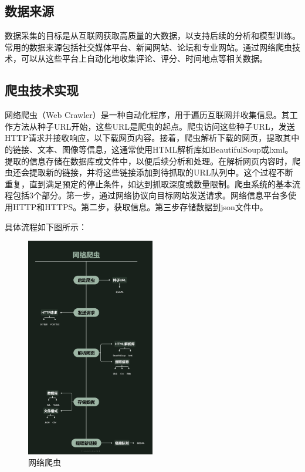 \documentclass[UTF8,a4paper,15pt,titlepage,oneside]{ctexbook}
\begin{document}
\subsection{数据来源}

数据采集的目标是从互联网获取高质量的大数据，以支持后续的分析和模型训练。常用的数据来源包括社交媒体平台、新闻网站、论坛和专业网站。通过网络爬虫技术，可以从这些平台上自动化地收集评论、评分、时间地点等相关数据。

\subsection{爬虫技术实现}

网络爬虫（Web Crawler）是一种自动化程序，用于遍历互联网并收集信息。其工作方法从种子URL开始，这些URL是爬虫的起点。爬虫访问这些种子URL，发送HTTP请求并接收响应，以下载网页内容。接着，爬虫解析下载的网页，提取其中的链接、文本、图像等信息，这通常使用HTML解析库如BeautifulSoup或lxml。提取的信息存储在数据库或文件中，以便后续分析和处理。在解析网页内容时，爬虫还会提取新的链接，并将这些链接添加到待抓取的URL队列中。这个过程不断重复，直到满足预定的停止条件，如达到抓取深度或数量限制。爬虫系统的基本流程包括3个部分。第一步，通过网络协议向目标网站发送请求。网络信息平台多使用HTTP和HTTPS。第二步，获取信息。第三步存储数据到json文件中。

具体流程如下图所示：


\begin{figure}[H]
  \centering
  \includegraphics[width=0.5\textwidth,keepaspectratio=false]{pictures/38.png} %
  \caption{网络爬虫}
  
\end{figure}
\end{document}
